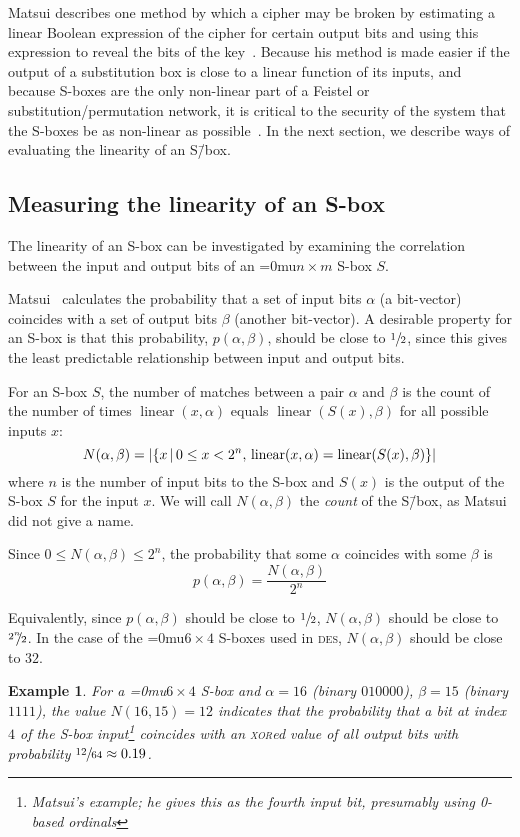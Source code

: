 \documentclass[a4paper,10pt,twoside,openright]{book}
\renewcommand{\sc}[1]{\textsc{\lowercase{#1}}}
\newcommand{\set}[1]{\left\{#1\right\}}
\newcommand{\N}{N(\alpha,\beta)}
\newtheorem{example}[theorem]{Example}
\newcommand*\sixbyfour{\begingroup\medmuskip=0mu\relax$6 \times 4$\endgroup}
\newcommand*\nbym{\begingroup\medmuskip=0mu\relax$n \times m$\endgroup}
\DeclareMathOperator{\lin}{linear}
\DeclarePairedDelimiter\Cardinality{\lvert}{\rvert}%
\begin{document}
Matsui describes one method by which a cipher may be broken 
by estimating a linear Boolean expression of the cipher for certain output bits
and using this expression to reveal the bits of the key~\cite{matsui}.
Because his method is made easier if the output of a substitution box is close to a linear function of its inputs,
and because S-boxes are the only non-linear part of a Feistel or substitution\-/permutation network, 
it is critical to the security of the system that the S-boxes be as non-linear as possible~\cite{sboxes}. 
In the next section, we describe ways of evaluating the linearity of an S\=/box.

\subsection{Measuring the linearity of an S-box}

The linearity of an S-box can be investigated by examining the correlation between the input and output bits of an \nbym{} S-box $S$.

Matsui~\cite{matsui} calculates the probability that a set of input bits $\alpha$ (a bit-vector) coincides with a set of output bits $\beta$ (another bit-vector). A desirable property for an S-box is that this probability, $p(\alpha, \beta)$, should be close to $\sfrac{1}{2}$,
since this gives the least predictable relationship between input and output bits.

For an S-box $S$, the number of matches between a pair $\alpha$ and $\beta$ is the count of the number of times 
$\lin(x,\alpha)$ equals $\lin(S(x),\beta)$ 
for all possible inputs $x$: 
\[\N = \Cardinality{\set{x\,\middle|\,0\leq x < 2^n,\,\lin(x,\alpha) = \lin(S(x),\beta)}}\] 
where $n$ is the number of input bits to the S-box and $S(x)$ is the output of the S-box $S$ for the input $x$. We will call $\N$ the \textit{count} of the S\=/box, as Matsui did not give a name.

Since $0 \leq \N \leq 2^n$, the probability that some $\alpha$ coincides with some $\beta$ is \[p(\alpha, \beta) = \frac{\N}{2^n}\]

Equivalently, since $p(\alpha,\beta)$ should be close to $\sfrac{1}{2}$, $\N$ should be close to $\sfrac{{2^n}\hspace{-0.4em}}{2}$. In the case of the \sixbyfour{} S-boxes used in \sc{DES}, $\N$ should be close to $32$.

\begin{example}
\label{ex:lat-entry} For a \sixbyfour{} S-box and $\alpha = 16$ (binary $010000$), $\beta = 15$ (binary $1111$), the value $N(16, 15) = 12$ indicates that the probability that a bit at index $4$ of the S-box input\footnote{Matsui's example; he gives this as the fourth input bit, presumably using 0-based ordinals} 
coincides with an \sc{XOR}ed value of all output bits with probability $\sfrac{12}{64} \approx 0.19$.
\end{example}
\end{document}
